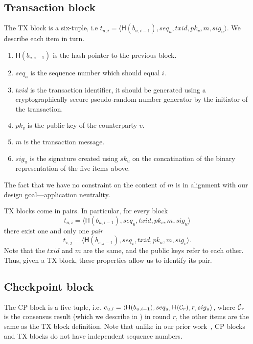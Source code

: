\subsection{Transaction block}
The TX block is a six-tuple, i.e $t_{u, i} = \langle \textsf{H}(b_{u, i - 1}), seq_u, txid, pk_v, m, sig_u \rangle$.
We describe each item in turn.
\begin{enumerate}
\item $\textsf{H}(b_{u, i - 1})$ is the hash pointer to the previous block.
\item $seq_u$ is the sequence number which should equal $i$.
\item $txid$ is the transaction identifier, it should be generated using a cryptographically secure pseudo-random number generator by the initiator of the transaction.
\item $pk_v$ is the public key of the counterparty $v$.
\item $m$ is the transaction message.
\item $sig_u$ is the signature created using $sk_u$ on the concatination of the binary representation of the five items above.
\end{enumerate}
The fact that we have no constraint on the content of $m$ is in alignment with our design goal---application neutrality.

TX blocks come in pairs.
In particular, for every block 
$$t_{u, i} = \langle \textsf{H}(b_{u, i - 1}), seq_u, txid, pk_v, m, sig_u \rangle$$
there exist one and only one \emph{pair} 
$$t_{v, j} = \langle \textsf{H}(b_{v, j - 1}), seq_v, txid, pk_u, m, sig_v \rangle.$$
Note that the $txid$ and $m$ are the same, and the public keys refer to each other.
Thus, given a TX block, these properties allow us to identify its pair.


\subsection{Checkpoint block}

The CP block is a five-tuple, 
i.e. $c_{u, i} = \langle \textsf{H}(b_{u, i-1}), seq_u, \textsf{H}(\mathcal{C}_r), r, sig_u \rangle$,
where $\mathcal{C}_r$ is the consensus result (which we describe in ) in round $r$, the other items are the same as the TX block definition.
Note that unlike in our prior work~\cite{implicitconsensus}, CP blocks and TX blocks do not have independent sequence numbers.

